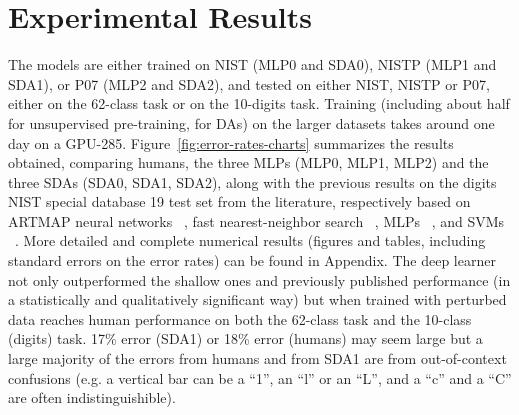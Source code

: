 \documentclass{article} %
\begin{document}
\section{Experimental Results}

The models are either trained on NIST (MLP0 and SDA0), 
NISTP (MLP1 and SDA1), or P07 (MLP2 and SDA2), and tested
on either NIST, NISTP or P07, either on the 62-class task
or on the 10-digits task. Training (including about half
for unsupervised pre-training, for DAs) on the larger
datasets takes around one day on a GPU-285.
Figure~\ref{fig:error-rates-charts} summarizes the results obtained,
comparing humans, the three MLPs (MLP0, MLP1, MLP2) and the three SDAs (SDA0, SDA1,
SDA2), along with the previous results on the digits NIST special database
19 test set from the literature, respectively based on ARTMAP neural
networks ~\citep{Granger+al-2007}, fast nearest-neighbor search
~\citep{Cortes+al-2000}, MLPs ~\citep{Oliveira+al-2002-short}, and SVMs
~\citep{Milgram+al-2005}.  More detailed and complete numerical results
(figures and tables, including standard errors on the error rates) can be
found in Appendix.
The deep learner not only outperformed the shallow ones and
previously published performance (in a statistically and qualitatively
significant way) but when trained with perturbed data
reaches human performance on both the 62-class task
and the 10-class (digits) task. 
17\% error (SDA1) or 18\% error (humans) may seem large but a large
majority of the errors from humans and from SDA1 are from out-of-context
confusions (e.g. a vertical bar can be a ``1'', an ``l'' or an ``L'', and a
``c'' and a ``C'' are often indistinguishible).
\end{document}
